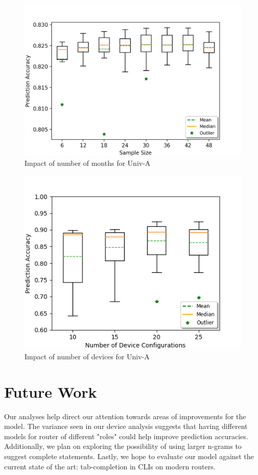 
\begin{figure}
	\centering
	\includegraphics[width=0.6\columnwidth]{monthly_analysis.png}
	\caption{Impact of number of months for Univ-A}
    \vspace{-1em}
    \label{fig:monthly_analysis}
\end{figure}
\begin{figure}
	\centering
	\includegraphics[width=0.6\columnwidth]{device_analysis.png}
	\caption{Impact of number of devices for Univ-A}
    \vspace{-1em}
    \label{fig:device_analysis}
\end{figure}

\section{Future Work}

Our analyses help direct our attention towards areas of improvements for the model. The variance seen in our device analysis suggests that having different models for router of different "roles" could help improve prediction accuracies. Additionally, we plan on exploring the possibility of using larger n-grams to suggest complete statements. Lastly, we hope to evaluate our model against the current state of the art: tab-completion in CLIs on modern routers.
